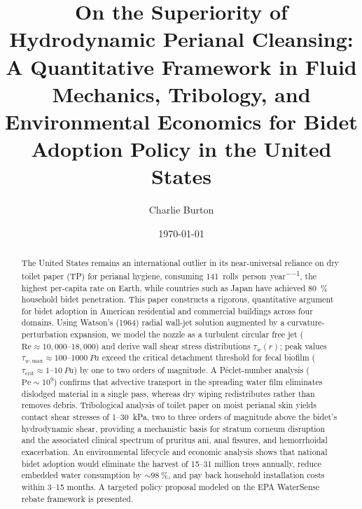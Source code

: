 \documentclass[aps,prfluids,reprint,amsmath,amssymb,floatfix]{revtex4-2}
\newcommand{\Rey}{\mathrm{Re}}
\newcommand{\Pe}{\mathrm{Pe}}
\begin{document}
\title{On the Superiority of Hydrodynamic Perianal Cleansing: A
       Quantitative Framework in Fluid Mechanics, Tribology, and
       Environmental Economics for Bidet Adoption Policy in the
       United States}

\author{Charlie Burton}

\date{\today}

\begin{abstract}
The United States remains an international outlier in its near-universal
reliance on dry toilet paper (TP) for perianal hygiene, consuming
\SI{141}{rolls\per person\per year}, the highest per-capita rate on
Earth, while countries such as Japan have achieved \SI{80}{\%} household
bidet penetration. This paper constructs a rigorous, quantitative argument
for bidet adoption in American residential and commercial buildings across
four domains. Using Watson's (1964) radial wall-jet solution augmented by a
curvature-perturbation expansion, we model the nozzle as a turbulent circular
free jet ($\Rey \approx 10{,}000$--$18{,}000$) and derive wall shear stress
distributions $\tau_w(r)$; peak values $\tau_{w,\mathrm{max}} \approx
100$--$\SI{1000}{Pa}$ exceed the critical detachment threshold for fecal
biofilm ($\tau_\mathrm{crit} \approx 1$--$\SI{10}{Pa}$) by one to two
orders of magnitude. A P\'{e}clet-number analysis ($\Pe \sim 10^9$)
confirms that advective transport in the spreading water film eliminates
dislodged material in a single pass, whereas dry wiping redistributes
rather than removes debris. Tribological analysis of toilet paper on moist
perianal skin yields contact shear stresses of 1--\SI{30}{kPa}, two to
three orders of magnitude above the bidet's hydrodynamic shear, providing
a mechanistic basis for stratum corneum disruption and the associated
clinical spectrum of pruritus ani, anal fissures, and hemorrhoidal
exacerbation. An environmental lifecycle and economic analysis shows that
national bidet adoption would eliminate the harvest of 15--31 million trees
annually, reduce embedded water consumption by $\sim\SI{98}{\%}$, and pay
back household installation costs within 3--15 months. A targeted policy
proposal modeled on the EPA WaterSense rebate framework is presented.
\end{abstract}

\maketitle
\end{document}
